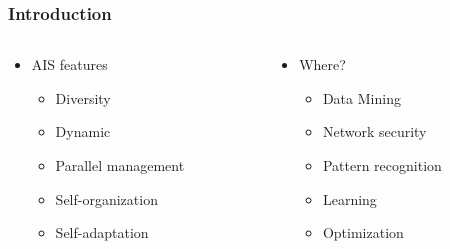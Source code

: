 \frame
{
\frametitle{Introduction}
\begin{columns}
\begin{column}{0.5\textwidth}
\begin{itemize}
	\item AIS features
	\begin{itemize}
		\item Diversity
		\item Dynamic
		\item Parallel management
		\item Self-organization
		\item Self-adaptation
	\end{itemize}
\end{itemize}
\end{column}

\begin{column}{0.5\textwidth}
\begin{itemize}
	\item Where?
	\begin{itemize}
		\item Data Mining
		\item Network security
		\item Pattern recognition
		\item Learning
		\item Optimization
	\end{itemize}
\end{itemize}
\end{column}
\end{columns}
}


